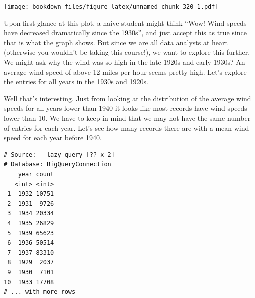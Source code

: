 \documentclass[]{krantz}
\makeatletter
\newenvironment{Shaded}{\begin{snugshade}}{\end{snugshade}}
\newcommand{\KeywordTok}[1]{\textcolor[rgb]{0.27,0.27,0.27}{\textbf{#1}}}
\newcommand{\DataTypeTok}[1]{\textcolor[rgb]{0.27,0.27,0.27}{#1}}
\newcommand{\DecValTok}[1]{\textcolor[rgb]{0.06,0.06,0.06}{#1}}
\newcommand{\StringTok}[1]{\textcolor[rgb]{0.5,0.5,0.5}{#1}}
\newcommand{\OperatorTok}[1]{\textcolor[rgb]{0.43,0.43,0.43}{\textbf{#1}}}
\newcommand{\NormalTok}[1]{#1}
\newenvironment{kframe}{%
\medskip{}
\setlength{\fboxsep}{.8em}
 \def\at@end@of@kframe{}%
 \ifinner\ifhmode%
  \def\at@end@of@kframe{\end{minipage}}%
  \begin{minipage}{\columnwidth}%
 \fi\fi%
 \def\FrameCommand##1{\hskip\@totalleftmargin \hskip-\fboxsep
 \colorbox{shadecolor}{##1}\hskip-\fboxsep
     \hskip-\linewidth \hskip-\@totalleftmargin \hskip\columnwidth}%
 \MakeFramed {\advance\hsize-\width
   \@totalleftmargin\z@ \linewidth\hsize
   \@setminipage}}%
 {\par\unskip\endMakeFramed%
 \at@end@of@kframe}
\renewenvironment{Shaded}{\begin{kframe}}{\end{kframe}}
\makeatother
\begin{document}
\texttt{[image: bookdown\_files/figure-latex/unnamed-chunk-320-1.pdf]}

Upon first glance at this plot, a naive student might think ``Wow! Wind
speeds have decreased dramatically since the 1930s'', and just accept
this as true since that is what the graph shows. But since we are all
data analysts at heart (otherwise you wouldn't be taking this course!),
we want to explore this further. We might ask why the wind was so high
in the late 1920s and early 1930s? An average wind speed of above 12
miles per hour seems pretty high. Let's explore the entries for all
years in the 1930s and 1920s.

\begin{Shaded}
\end{Shaded}

Well that's interesting. Just from looking at the distribution of the
average wind speeds for all years lower than 1940 it looks like most
records have wind speeds lower than 10. We have to keep in mind that we
may not have the same number of entries for each year. Let's see how
many records there are with a mean wind speed for each year before 1940.

\begin{Shaded}
\end{Shaded}

\begin{verbatim}
# Source:   lazy query [?? x 2]
# Database: BigQueryConnection
    year count
   <int> <int>
 1  1932 10751
 2  1931  9726
 3  1934 20334
 4  1935 26829
 5  1939 65623
 6  1936 50514
 7  1937 83310
 8  1929  2037
 9  1930  7101
10  1933 17708
# ... with more rows
\end{verbatim}
\end{document}
